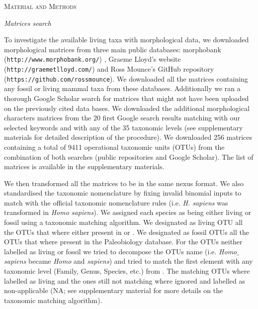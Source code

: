 \documentclass[12pt,letterpaper]{article}
\renewcommand{\section}[1]{%
\bigskip
\begin{center}
\begin{Large}
\normalfont\scshape #1
\medskip
\end{Large}
\end{center}}
\renewcommand{\subsection}[1]{%
\bigskip
\begin{center}
\begin{large}
\normalfont\itshape #1
\end{large}
\end{center}}
\begin{document}
%
%
 

\section{Material and Methods}
\subsection{Matrices search}
To investigate the available living taxa with morphological data, we downloaded morphological matrices from three main public databases: morphobank (\texttt{http://www.morphobank.org/}) \cite{morphobank}, Graeme Lloyd's website (\texttt{http://graemetlloyd.com/}) and Ross Mounce's GitHub repository (\texttt{https://github.com/rossmounce}). We downloaded all the matrices containing any fossil or living mammal taxa from these databases. Additionally we ran a thorough Google Scholar search for matrices that might not have been uploaded on the previously cited data bases. We downloaded the additional morphological characters matrices from the 20 first Google search results matching with our selected keywords and with any of the 35 taxonomic levels (see supplementary materials for detailed description of the procedure). We downloaded 256 %
matrices containing a total of 9411 %
operational taxonomic units (OTUs) from the combination of both searches (public repositories and Google Scholar). The list of matrices is available in the supplementary materials.

We then transformed all the matrices to be in the same nexus format. We also standardised the taxonomic nomenclature by fixing invalid binomial inputs to match with the official taxonomic nomenclature rules (i.e. \textit{H. sapiens} was transformed in \textit{Homo sapiens}). We assigned each species as being either living or fossil using a taxonomic matching algorithm. We designated as living OTU all the OTUs that where either present in \cite{FritzTree} or \cite{wilson2005mammal}. We designated as fossil OTUs all the OTUs that where present in the Paleobiology database. For the OTUs neither labelled as living or fossil we tried to decompose the OTUs name (i.e. \textit{Homo$\_$sapiens} became \textit{Homo} and \textit{sapiens}) and tried to match the first element with any taxonomic level (Family, Genus, Species, etc.) from \cite{wilson2005mammal}. The matching OTUs where labelled as living and the ones still not matching where ignored and labelled as non-applicable (NA; see supplementary material for more details on the taxonomic matching algorithm).
\end{document}
